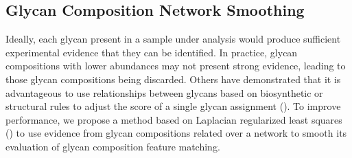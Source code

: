 \subsection{Glycan Composition Network Smoothing}

    Ideally, each glycan present in a sample under analysis would produce sufficient
    experimental evidence that they can be identified. In practice, glycan
    compositions with lower abundances may not present strong evidence, leading
    to those glycan compositions being discarded. Others have demonstrated that
    it is advantageous to use relationships between glycans based on biosynthetic
    or structural rules to adjust the score of a single glycan assignment
    (\cite{Goldberg2009, Kronewitter2014}). To improve performance, we propose
    a method based on Laplacian regularized least squares (\cite{Belkin2006})
    to use evidence from glycan compositions related over a network to smooth
    its evaluation of glycan composition feature matching.

    

    

    


